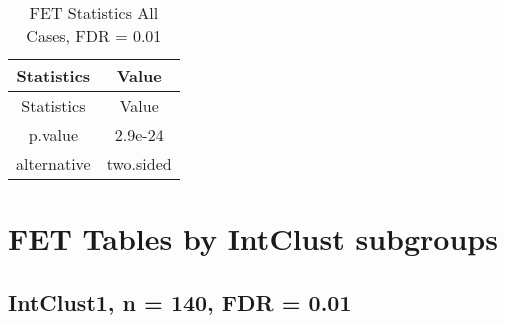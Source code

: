 \documentclass[]{article}
\begin{document}
\begin{longtable}[]{@{}cc@{}}
\caption{FET Statistics All Cases, FDR = 0.01}\tabularnewline
\toprule
\begin{minipage}[b]{0.18\columnwidth}\centering\strut
Statistics\strut
\end{minipage} & \begin{minipage}[b]{0.14\columnwidth}\centering\strut
Value\strut
\end{minipage}\tabularnewline
\midrule
\endfirsthead
\toprule
\begin{minipage}[b]{0.18\columnwidth}\centering\strut
Statistics\strut
\end{minipage} & \begin{minipage}[b]{0.14\columnwidth}\centering\strut
Value\strut
\end{minipage}\tabularnewline
\midrule
\endhead
\begin{minipage}[t]{0.18\columnwidth}\centering\strut
p.value\strut
\end{minipage} & \begin{minipage}[t]{0.14\columnwidth}\centering\strut
2.9e-24\strut
\end{minipage}\tabularnewline
\begin{minipage}[t]{0.18\columnwidth}\centering\strut
alternative\strut
\end{minipage} & \begin{minipage}[t]{0.14\columnwidth}\centering\strut
two.sided\strut
\end{minipage}\tabularnewline
\bottomrule
\end{longtable}

\pagebreak

\section{FET Tables by IntClust
subgroups}\label{fet-tables-by-intclust-subgroups}

\subsection{IntClust1, n = 140, FDR =
0.01}\label{intclust1-n-140-fdr-0.01}
\end{document}
